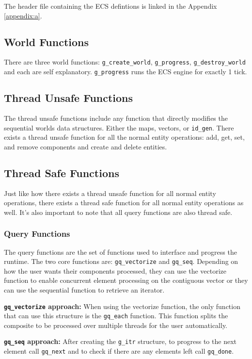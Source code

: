 The header file containing the ECS defintions is linked in the Appendix \ref{appendix:a}.

\subsection{World Functions}
There are three world functions: \texttt{g\_create\_world}, \texttt{g\_progress}, \texttt{g\_destroy\_world} and each are self explanatory. \texttt{g\_progress} runs the ECS engine for exactly 1 tick.

\subsection{Thread Unsafe Functions}
The thread unsafe functions include any function that directly modifies the sequential worlds data structures. Either the maps, vectors, or \texttt{id\_gen}. There exists a thread unsafe function for all the normal entity operations: add, get, set, and remove components and create and delete entities.  

\subsection{Thread Safe Functions}

Just like how there exists a thread unsafe function for all normal entity operations, there exists a thread safe function for all normal entity operations as well. It's also important to note that all query functions are also thread safe.

\subsubsection{Query Functions}
The query functions are the set of functions used to interface and progress the runtime. The two core functions are: \texttt{gq\_vectorize} and \texttt{gq\_seq}. Depending on how the user wants their components processed, they can use the vectorize function to enable concurrent element processing on the contiguous vector or they can use the sequential function to retrieve an iterator.

\textbf{\texttt{gq\_vectorize} approach:} When using the vectorize function, the only function that can use this structure is the \texttt{gq\_each} function. This function splits the composite to be processed over multiple threads for the user automatically.

\textbf{\texttt{gq\_seq} approach:} After creating the \texttt{g\_itr} structure, to progress to the next element call \texttt{gq\_next} and to check if there are any elements left call \texttt{gq\_done}.

